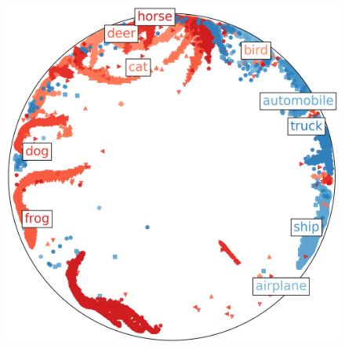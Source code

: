 \begin{figure}[!ht]
    \centering
    \begin{minipage}{0.25\textwidth}
        \centering
        \includegraphics[width=\linewidth]{figures/hypstructure_cifar10_centers_main_1.png}
        \label{fig:hyp_umap_cifar10}
    \end{minipage}
    \hfill
\end{figure}
